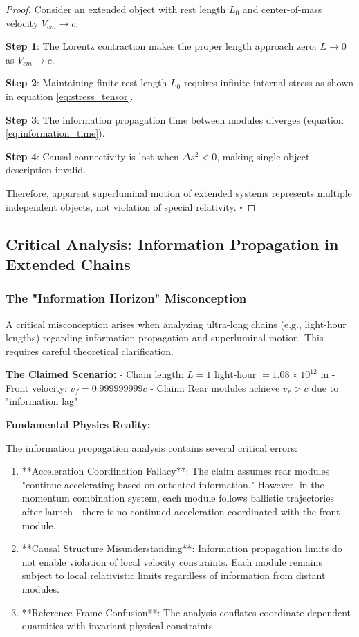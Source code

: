 \documentclass[11pt,a4paper]{article}
\theoremstyle{remark}
\begin{document}
\begin{proof}
Consider an extended object with rest length $L_0$ and center-of-mass velocity $V_{cm} \to c$.

\textbf{Step 1}: The Lorentz contraction makes the proper length approach zero: $L \to 0$ as $V_{cm} \to c$.

\textbf{Step 2}: Maintaining finite rest length $L_0$ requires infinite internal stress as shown in equation \ref{eq:stress_tensor}.

\textbf{Step 3}: The information propagation time between modules diverges (equation \ref{eq:information_time}).

\textbf{Step 4}: Causal connectivity is lost when $\Delta s^2 < 0$, making single-object description invalid.

Therefore, apparent superluminal motion of extended systems represents multiple independent objects, not violation of special relativity. $\square$
\end{proof}

\subsection{Critical Analysis: Information Propagation in Extended Chains}

\subsubsection{The "Information Horizon" Misconception}

A critical misconception arises when analyzing ultra-long chains (e.g., light-hour lengths) regarding information propagation and superluminal motion. This requires careful theoretical clarification.

\textbf{The Claimed Scenario:}
- Chain length: $L = 1$ light-hour $= 1.08 \times 10^{12}$ m
- Front velocity: $v_f = 0.999999999c$
- Claim: Rear modules achieve $v_r > c$ due to "information lag"

\textbf{Fundamental Physics Reality:}

The information propagation analysis contains several critical errors:

\begin{enumerate}
\item **Acceleration Coordination Fallacy**: The claim assumes rear modules "continue accelerating based on outdated information." However, in the momentum combination system, each module follows ballistic trajectories after launch - there is no continued acceleration coordinated with the front module.

\item **Causal Structure Misunderstanding**: Information propagation limits do not enable violation of local velocity constraints. Each module remains subject to local relativistic limits regardless of information from distant modules.

\item **Reference Frame Confusion**: The analysis conflates coordinate-dependent quantities with invariant physical constraints.
\end{enumerate}
\end{document}
